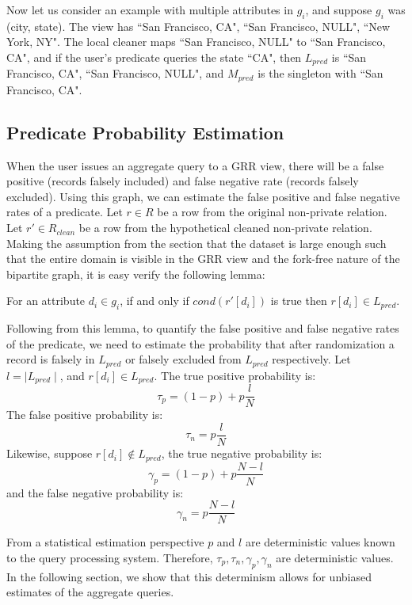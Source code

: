 \begin{example}
Now let us consider an example with multiple attributes in $g_i$, and suppose $g_i$ was (\textsf{city}, \textsf{state}). 
The view has ``San Francisco, CA", ``San Francisco, NULL", ``New York, NY".
The local cleaner maps ``San Francisco, NULL" to ``San Francisco, CA", and if the user's predicate queries the \textsf{state} ``CA", then $L_{pred}$ is ``San Francisco, CA", ``San Francisco, NULL", and $M_{pred}$ is the singleton with ``San Francisco, CA".
\end{example}

\subsection{Predicate Probability Estimation}
When the user issues an aggregate query to a GRR view, there will be a false positive (records falsely included) and false negative rate (records falsely excluded).
Using this graph, we can estimate the false positive and false negative rates of a predicate.
Let $r \in R$ be a row from the original non-private relation.
Let $r' \in R_{clean}$ be a row from the hypothetical cleaned non-private relation.
Making the assumption from the section that the dataset is large enough such that the entire domain is visible in the GRR view and the fork-free nature of the bipartite graph, it is easy verify the following lemma:
\begin{lemma}\label{pre-image}
For an attribute $d_i \in g_i$, if and only if $cond(r'[d_i])$ is true then $r[d_i] \in L_{pred}$.
\end{lemma} 

Following from this lemma, to quantify the false positive and false negative rates of the predicate, we need to estimate the probability that after randomization a record is falsely in $L_{pred}$ or falsely excluded from $L_{pred}$ respectively.
Let $l = \mid L_{pred} \mid$, and $r[d_i] \in L_{pred}$.
The true positive probability is: 
\[
\tau_p = (1-p) + p \frac{l}{N}
\]
The false positive probability is: 
\[
\tau_n = p \frac{l}{N}
\]
Likewise, suppose $r[d_i] \not\in L_{pred}$, the true negative probability is:
\[
\gamma_p = (1-p) + p \frac{N-l}{N}
\]
and the false negative probability is:
\[
\gamma_n = p \frac{N-l}{N}
\]

From a statistical estimation perspective $p$ and $l$ are deterministic values known to the query processing system.
Therefore, $\tau_p,\tau_n,\gamma_p,\gamma_n$ are deterministic values.
In the following section, we show that this determinism allows for unbiased estimates of the aggregate queries.

